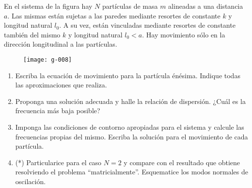 \item
En el sistema de la figura hay \(N\) partículas de masa \(m\) alineadas a una distancia \(a\).
Las mismas están sujetas a las paredes mediante resortes de constante \(k\) y longitud natural \(l_0\).
A su vez, están vinculadas mediante resortes de constante también del mismo \(k\) y longitud natural \(l_0 < a\).
Hay movimiento sólo en la dirección longitudinal a las partículas.
\begin{figure}[ht]
	\centering
	\texttt{[image: g-008]}
\end{figure}
\begin{enumerate}
	\item Escriba la ecuación de movimiento para la partícula énésima.
	Indique todas las aproximaciones que realiza.
	\item Proponga una solución adecuada y halle la relación de dispersión.
	¿Cuál es la frecuencia más baja posible?
	\item Imponga las condiciones de contorno apropiadas para el sistema y calcule las frecuencias propias del mismo.
	Escriba la solución para el movimiento de cada partícula.
	\item (*) Particularice para el caso \(N = 2\) y compare con el resultado que obtiene resolviendo el problema ``matricialmente''.
	Esquematice los modos normales de oscilación.	
\end{enumerate}


